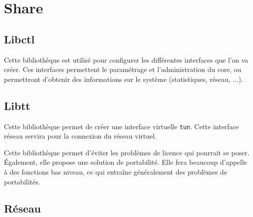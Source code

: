 \section{Share}
\subsection{Libctl}
Cette bibliothèque est utilisé pour configurer les différentes interfaces que
l'on va créer. Ces interfaces permettent le paramétrage et l'administration
du core, ou permettront d'obtenir des informations sur le système
(statistiques, réseau, ...).

\subsection{Libtt}
Cette bibliothèque permet de créer une interface virtuelle \texttt{tun}.
Cette interface réseau servira pour la connexion du réseau virtuel.

Cette bibliothèque permet d'éviter les problèmes de licence qui pourrait se poser.
Également, elle propose une solution de portabilité. Elle fera beaucoup d'appelle à des
fonctions bas niveau, ce qui entraîne généralement des problèmes de portabilités.

\subsection{Réseau}
